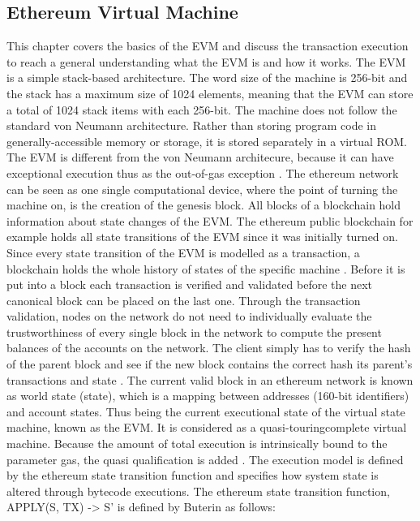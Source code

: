 \subsection{Ethereum Virtual Machine}
\label{subsec:background:first_section:ethereum}
This chapter covers the basics of the \ac{EVM} and discuss the transaction execution to reach a general understanding what the \ac{EVM} is and how it works. The \ac{EVM} is a simple stack-based architecture. The word size of the machine is 256-bit and the stack has a maximum size of 1024 elements, meaning that the \ac{EVM} can store a total of 1024 stack items with each 256-bit. The machine does not follow the standard von Neumann architecture. Rather than storing program code in generally-accessible memory or storage, it is stored separately in a virtual ROM. The \ac{EVM} is different from the von Neumann architecure, because it can have exceptional execution thus as the out-of-gas exception \cite{wood2014ethereum}. The ethereum network can be seen as one single computational device, where the point of turning the machine on, is the creation of the genesis block. All blocks of a blockchain hold information about state changes of the \ac{EVM}. The ethereum public blockchain for example holds all state transitions of the \ac{EVM} since it was initially turned on. Since every state transition of the \ac{EVM} is modelled as a transaction, a blockchain holds the whole history of states of the specific machine \cite{dannen2017introducing}. Before it is put into a block each transaction is verified and validated before the next canonical block can be placed on the last one. Through the transaction validation, nodes on the network do not need to individually evaluate the trustworthiness of every single block in the network to compute the present balances of the accounts on the network. The client simply has to verify the hash of the parent block and see if the new block contains the correct hash its parent’s transactions and state \cite{dannen2017introducing}. The current valid block in an ethereum network is known as world state (state), which is a mapping between addresses (160-bit identifiers) and account states. Thus being the current executional state of the virtual state machine, known as the \ac{EVM}. It is considered as a quasi-touringcomplete virtual machine. Because the amount of total execution is intrinsically bound to the parameter gas, the quasi  qualification is added \cite{wood2014ethereum}. The execution model is defined by the ethereum state transition function and specifies how system state is altered through bytecode executions. \newline \newline
The ethereum state transition function, APPLY(S, TX) -> S' is defined by Buterin \cite{buterin2013ethereum}  as follows:

